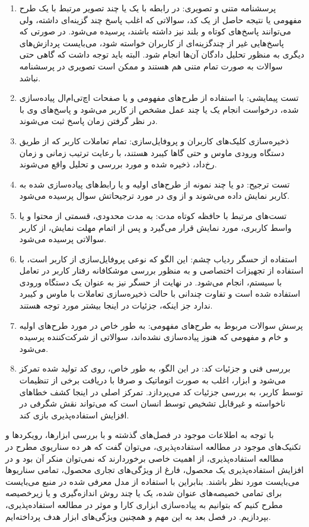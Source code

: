 \begin{enumerate}
	\item
	پرسشنامه متنی و تصویری: در رابطه با یک یا چند تصویر مرتبط با یک طرح مفهومی یا نتیجه حاصل از یک کد، سوالاتی که اغلب پاسخ چند گزینه‌ای داشته، ولی می‌توانند پاسخ‌های کوتاه و بلند نیز داشته باشند، پرسیده می‌شود. در صورتی که پاسخ‌هایی غیر از چندگزینه‌ای از کاربران خواسته شود، می‌بایست پردازش‌های دیگری به منظور تحلیل دادگان آن‌ها انجام شود. البته باید توجه داشت که گاهی حتی سوالات به صورت تمام متنی هم هستند و ممکن است تصویری در پرسشنامه نباشد.
	\item 
	تست پیمایشی: با استفاده از طرح‌های مفهومی و یا صفحات اچ‌تی‌ام‌ال پیاده‌سازی شده، درخواست انجام یک یا چند عمل مشخص از کاربر می‌شود و پاسخ‌های وی با در نظر گرفتن زمان پاسخ ثبت می‌شوند.
	\item 
	ذخیره‌سازی کلیک‌های کاربران و پروفایل‌سازی: تمام تعاملات کاربر که از طریق دستگاه ورودی ماوس و حتی گاها کیبرد هستند، با رعایت ترتیب زمانی و زمان رخ‌داد، ذخیره شده و مورد بررسی و تحلیل واقع می‌شوند.
	\item 
	تست ترجیح: دو یا چند نمونه از طرح‌های اولیه و یا رابط‌های پیاده‌سازی شده به کاربر نمایش داده می‌شوند و از وی در مورد ترجیحاتش سوال پرسیده می‌شود.
	\item 
	تست‌های مرتبط با حافظه کوتاه مدت: به مدت محدودی، قسمتی از محتوا و یا واسط کاربری، مورد نمایش قرار می‌گیرد و پس از اتمام مهلت نمایش، از کاربر سوالاتی پرسیده می‌شود.
	\item 
	استفاده از حسگر ردیاب چشم:	این الگو که نوعی پروفایل‌سازی از کاربر است، با استفاده از تجهیزات اختصاصی و به منظور بررسی موشکافانه رفتار کاربر در تعامل با سیستم، انجام می‌شود. در نهایت از حسگر نیز به عنوان یک دستگاه ورودی استفاده شده است و تفاوت چندانی با حالت ذخیره‌سازی تعاملات با ماوس و کیبرد ندارد جز اینکه، جزئیات در اینجا بیشتر مورد توجه هستند.
	\item 
	پرسش سوالات مربوط به طرح‌های مفهومی: به طور خاص در مورد طرح‌های اولیه و خام و مفهومی که هنوز پیاده‌سازی نشده‌اند، سوالاتی از شرکت‌کننده پرسیده می‌شود.
	\item 
	بررسی فنی و جزئیات کد: در این الگو، به طور خاص، روی کد تولید شده تمرکز می‌شود و ابزار، اغلب به صورت اتوماتیک و صرفا با دریافت برخی از تنظیمات توسط کاربر، به بررسی جزئیات کد می‌پردازد. تمرکز اصلی در اینجا کشف خطاهای ناخواسته و غیرقابل تشخیص توسط انسان است که می‌تواند نقش شگرفی در افزایش استفاده‌پذیری بازی کند.
\end{enumerate}
با توجه به اطلاعات موجود در فصل‌های گذشته و با بررسی ابزارها، رویکردها و تکنیک‌های موجود در مطالعه استفاده‌پذیری، می‌توان گفت که هر ده سناریوی مطرح در مطالعه استفاده‌پذیری، از اهمیت خاصی برخوردارند که نمی‌توان منکر آن بود و در افزایش استفاده‌پذیری یک محصول، فارغ از ویژگی‌های تجاری محصول، تمامی سناریوها می‌بایست مورد نظر باشند. بنابراین با استفاده از مدل معرفی شده در منبع
\cite{albert_measuring_2013}
می‌بایست برای تمامی خصیصه‌های عنوان شده، یک یا چند روش اندازه‌گیری و یا زیرخصیصه مطرح کنیم که بتوانیم به پیاده‌سازی ابزاری کارا و موثر در مطالعه استفاده‌پذیری، بپردازیم. در فصل بعد به این مهم و همچنین ویژگی‌های ابزار هدف پرداخته‌ایم.
